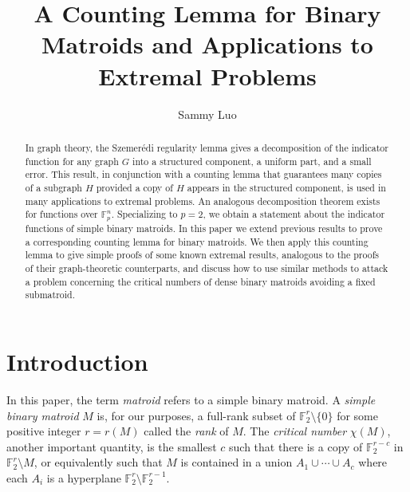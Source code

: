 \documentclass{article}
\theoremstyle{plain}
\theoremstyle{definition}
\theoremstyle{definition}
\theoremstyle{remark}
\numberwithin{equation}{section}
\newcommand{\FF}{\mathbb{F}}
\begin{document}
\title{A Counting Lemma for Binary Matroids and Applications to Extremal Problems}

\author{Sammy Luo}

\maketitle

\begin{abstract}
In graph theory, the Szemerédi regularity lemma gives a decomposition of the indicator function for any graph $G$ into a structured component, a uniform part, and a small error. This result, in conjunction with a counting lemma that guarantees many copies of a subgraph $H$ provided a copy of $H$ appears in the structured component, is used in many applications to extremal problems. An analogous decomposition theorem exists for functions over $\FF_p^n$. Specializing to $p=2$, we obtain a statement about the indicator functions of simple binary matroids. In this paper we extend previous results to prove a corresponding counting lemma for binary matroids. We then apply this counting lemma to give simple proofs of some known extremal results, analogous to the proofs of their graph-theoretic counterparts, and discuss how to use similar methods to attack a problem concerning the critical numbers of dense binary matroids avoiding a fixed submatroid.
\end{abstract}

\section{Introduction}
In this paper, the term \emph{matroid} refers to a simple binary matroid. A \emph{simple binary matroid} $M$ is, for our purposes, a full-rank subset of $\FF_2^r\setminus \{0\}$ for some positive integer $r=r(M)$ called the \emph{rank} of $M$. The \emph{critical number} $\chi(M)$, another important quantity, is the smallest $c$ such that there is a copy of $\FF_2^{r-c}$ in $\FF_2^r\setminus M$, or equivalently such that $M$ is contained in a union $A_1\cup\cdots\cup A_c$ where each $A_i$ is a hyperplane $\FF_2^r\setminus \FF_2^{r-1}$.
\end{document}
